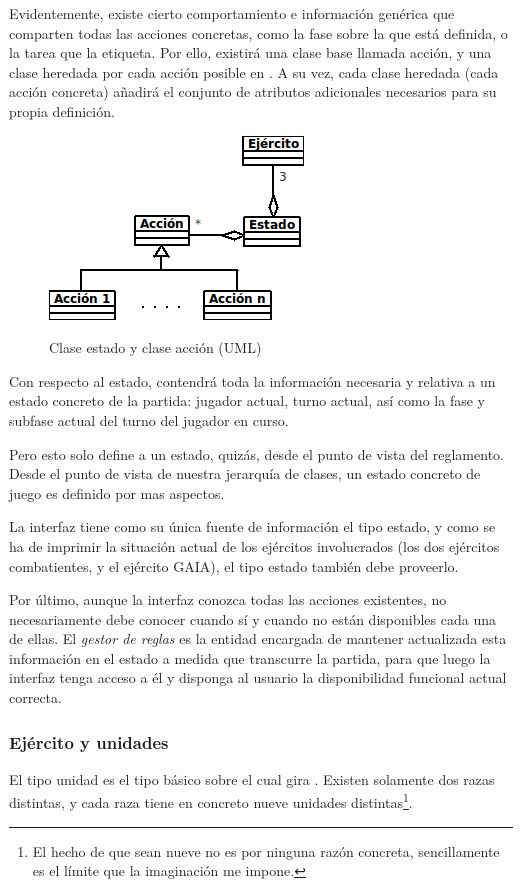 Evidentemente, existe cierto comportamiento e información genérica que
comparten todas las acciones concretas, como la fase sobre la que está
definida, o la tarea que la etiqueta. Por ello, existirá una clase
base llamada acción, y una clase heredada por cada acción posible en
\gomf. A su vez, cada clase heredada (cada acción concreta) añadirá el
conjunto de atributos adicionales necesarios para su propia
definición.

\begin{figure}[h]
\centering
\includegraphics[scale=.8]{./imagenes/Estado.png}
\label{fig:estado}
\caption{Clase estado y clase acción (UML)}
\end{figure}

Con respecto al estado, contendrá toda la información necesaria y
relativa a un estado concreto de la partida: jugador actual, turno
actual, así como la fase y subfase actual del turno del jugador en
curso.

Pero esto solo define a un estado, quizás, desde el punto de vista del
reglamento. Desde el punto de vista de nuestra jerarquía de clases, un
estado concreto de juego es definido por mas aspectos.

La interfaz tiene como su única fuente de información el tipo estado,
y como se ha de imprimir la situación actual de los ejércitos
involucrados (los dos ejércitos combatientes, y el ejército GAIA), el
tipo estado también debe proveerlo.

Por último, aunque la interfaz conozca todas las acciones existentes,
no necesariamente debe conocer cuando sí y cuando no están
disponibles cada una de ellas. El \emph{gestor de reglas} es la
entidad encargada de mantener actualizada esta información en el
estado a medida que transcurre la partida, para que luego la interfaz
tenga acceso a él y disponga al usuario la disponibilidad funcional
actual correcta.

\subsubsection{Ejército y unidades}
El tipo unidad es el tipo básico sobre el cual gira \gomf. Existen
solamente dos razas distintas, y cada raza tiene en concreto nueve
unidades distintas\footnote{El hecho de que sean nueve no es por
  ninguna razón concreta, sencillamente es el límite que la
  imaginación me impone.}.

